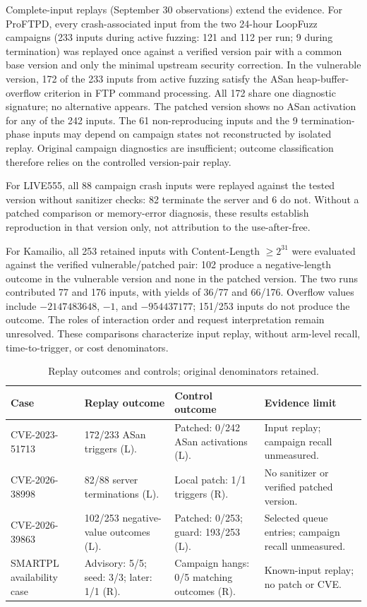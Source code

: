 \documentclass[final,5p,times,number]{elsarticle}
\begin{document}
Complete-input replays (September 30 observations) extend the evidence. For ProFTPD, every crash-associated input from the two 24-hour LoopFuzz campaigns (233 inputs during active fuzzing: 121 and 112 per run; 9 during termination) was replayed once against a verified version pair with a common base version and only the minimal upstream security correction. In the vulnerable version, 172 of the 233 inputs from active fuzzing satisfy the ASan heap-buffer-overflow criterion in FTP command processing. All 172 share one diagnostic signature; no alternative appears. The patched version shows no ASan activation for any of the 242 inputs. The 61 non-reproducing inputs and the 9 termination-phase inputs may depend on campaign states not reconstructed by isolated replay. Original campaign diagnostics are insufficient; outcome classification therefore relies on the controlled version-pair replay.

For LIVE555, all 88 campaign crash inputs were replayed against the tested version without sanitizer checks: 82 terminate the server and 6 do not. Without a patched comparison or memory-error diagnosis, these results establish reproduction in that version only, not attribution to the use-after-free.

For Kamailio, all 253 retained inputs with Content-Length $\geq 2^{31}$ were evaluated against the verified vulnerable/patched pair: 102 produce a negative-length outcome in the vulnerable version and none in the patched version. The two runs contributed 77 and 176 inputs, with yields of 36/77 and 66/176. Overflow values include $-2147483648$, $-1$, and $-954437177$; 151/253 inputs do not produce the outcome. The roles of interaction order and request interpretation remain unresolved. These comparisons characterize input replay, without arm-level recall, time-to-trigger, or cost denominators.

\begin{table}[!tbp]
\centering\small
\caption{Replay outcomes and controls; original denominators retained.}
\label{tab:cveresults}
\begin{tabularx}{\textwidth}{@{}>{\raggedright\arraybackslash}p{} Y Y Y@{}}
\toprule
Case & Replay outcome & Control outcome & Evidence limit \\
\midrule
\mbox{CVE-2023-51713} & 172/233 ASan triggers (L). & Patched: 0/242 ASan activations (L). & Input replay; campaign recall unmeasured. \\
\addlinespace[3pt]
\mbox{CVE-2026-38998} & 82/88 server terminations (L). & Local patch: 1/1 triggers (R). & No sanitizer or verified patched version. \\
\addlinespace[3pt]
\mbox{CVE-2026-39863} & 102/253 negative-value outcomes (L). & Patched: 0/253; guard: 193/253 (L). & Selected queue entries; campaign recall unmeasured. \\
\addlinespace[3pt]
SMARTPL availability case & Advisory: 5/5; seed: 3/3; later: 1/1 (R). & Campaign hangs: 0/5 matching outcomes (R). & Known-input replay; no patch or CVE. \\
\bottomrule
\end{tabularx}
\end{table}
\end{document}
